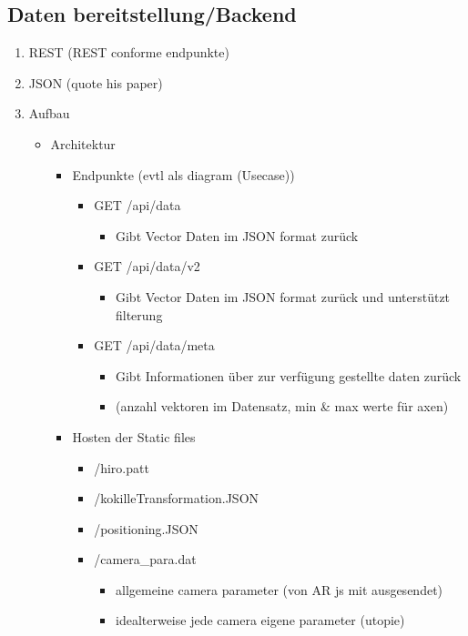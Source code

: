 \subsection{Daten bereitstellung/Backend}

\begin{enumerate}
	\item REST (REST conforme endpunkte)
	\item JSON (quote his paper)
	\item Aufbau
	\begin{itemize}
		\item Architektur
		\begin{itemize}
			\item Endpunkte (evtl als diagram (Usecase))
			\begin{itemize}
				\item GET /api/data
				\begin{itemize}
					\item Gibt Vector Daten im JSON format zurück
				\end{itemize}
				
				\item GET /api/data/v2
				\begin{itemize}
					\item Gibt Vector Daten im JSON format zurück und unterstützt filterung
				\end{itemize}
				
				\item GET /api/data/meta
				\begin{itemize}
					\item Gibt Informationen über zur verfügung gestellte daten zurück
					\item (anzahl vektoren im Datensatz, min \& max werte für axen)
				\end{itemize}
			\end{itemize}
			
			\item Hosten der Static files
			\begin{itemize}
				\item /hiro.patt
				\item /kokilleTransformation.JSON
				\item /positioning.JSON
				\item /camera\_para.dat
				\begin{itemize}
					\item allgemeine camera parameter (von AR js mit ausgesendet)
					\item idealterweise jede camera eigene parameter (utopie)
				\end{itemize}
				

\end{itemize}
\end{itemize}
\end{itemize}
\end{enumerate}
